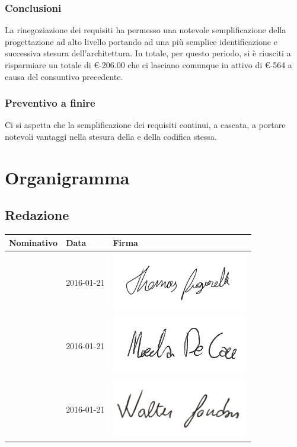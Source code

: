 \documentclass[12pt,a4paper]{article}
\begin{document}
\subsubsection{Conclusioni}
La rinegoziazione dei requisiti ha permesso una notevole semplificazione della progettazione ad alto livello portando
ad una più semplice identificazione e successiva stesura dell'architettura.
In totale, per questo periodo, si è riusciti a risparmiare un totale di \euro{}-206.00 che ci lasciano
comunque in attivo di \euro{}-564 a causa del consuntivo precedente.

\subsubsection{Preventivo a finire}
Ci si aspetta che la semplificazione dei requisiti continui, a cascata, a portare notevoli vantaggi
nella stesura della \DP{} e della codifica stessa.

\newpage

\appendix
\section{Organigramma}

\subsection{Redazione}

\begin{table}[H]
	\begin{center}
		\begin{tabular}{l l l}
			\toprule
            \textbf{Nominativo}	& \textbf{Data} & \textbf{Firma} \\ \midrule
			\midrule
            \TP{} & 2016-01-21 & \includegraphics[width=6cm]{../img/firmaPigarelli.png} \\ \midrule
            \NDC{} & 2016-01-21 & \includegraphics[width=6cm]{../img/firmaDeCao.png} \\ \midrule
			\WS{} & 2016-01-21 & \includegraphics[width=6cm]{../img/firmaSandon.png} \\
			\bottomrule
		\end{tabular}
	\end{center}
\end{table}
\end{document}
